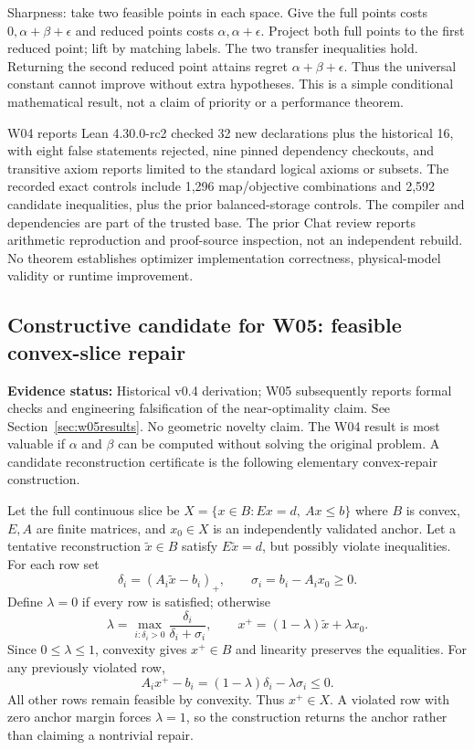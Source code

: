 \documentclass[11pt,letterpaper]{article}
\newcommand{\status}[1]{\textbf{Evidence status:} #1}
\begin{document}
Sharpness: take two feasible points in each space. Give the full points costs $0,\alpha+\beta+\epsilon$ and reduced points costs $\alpha,\alpha+\epsilon$. Project both full points to the first reduced point; lift by matching labels. The two transfer inequalities hold. Returning the second reduced point attains regret $\alpha+\beta+\epsilon$. Thus the universal constant cannot improve without extra hypotheses. This is a simple conditional mathematical result, not a claim of priority or a performance theorem.

W04 reports Lean 4.30.0-rc2 checked 32 new declarations plus the historical 16, with eight false statements rejected, nine pinned dependency checkouts, and transitive axiom reports limited to the standard logical axioms or subsets. The recorded exact controls include 1,296 map/objective combinations and 2,592 candidate inequalities, plus the prior balanced-storage controls. The compiler and dependencies are part of the trusted base. The prior Chat review reports arithmetic reproduction and proof-source inspection, not an independent rebuild. No theorem establishes optimizer implementation correctness, physical-model validity or runtime improvement.

\subsection{Constructive candidate for W05: feasible convex-slice repair}
\label{sec:repair}
\status{Historical v0.4 derivation; W05 subsequently reports formal checks and engineering falsification of the near-optimality claim. See Section~\ref{sec:w05results}. No geometric novelty claim.}
The W04 result is most valuable if $\alpha$ and $\beta$ can be computed without solving the original problem. A candidate reconstruction certificate is the following elementary convex-repair construction.

Let the full continuous slice be $X=\{x\in B: Ex=d,\ Ax\le b\}$ where $B$ is convex, $E,A$ are finite matrices, and $x_0\in X$ is an independently validated anchor. Let a tentative reconstruction $\tilde x\in B$ satisfy $E\tilde x=d$, but possibly violate inequalities. For each row set
\[
 \delta_i=(A_i\tilde x-b_i)_+,\qquad
 \sigma_i=b_i-A_ix_0\ge0.
\]
Define $\lambda=0$ if every row is satisfied; otherwise
\[
 \lambda=\max_{i:\delta_i>0}
       \frac{\delta_i}{\delta_i+\sigma_i},\qquad
 x^+=(1-\lambda)\tilde x+\lambda x_0.
\]
Since $0\le\lambda\le1$, convexity gives $x^+\in B$ and linearity preserves the equalities. For any previously violated row,
\[
 A_i x^+-b_i=(1-\lambda)\delta_i-\lambda\sigma_i\le0.
\]
All other rows remain feasible by convexity. Thus $x^+\in X$. A violated row with zero anchor margin forces $\lambda=1$, so the construction returns the anchor rather than claiming a nontrivial repair.
\end{document}
